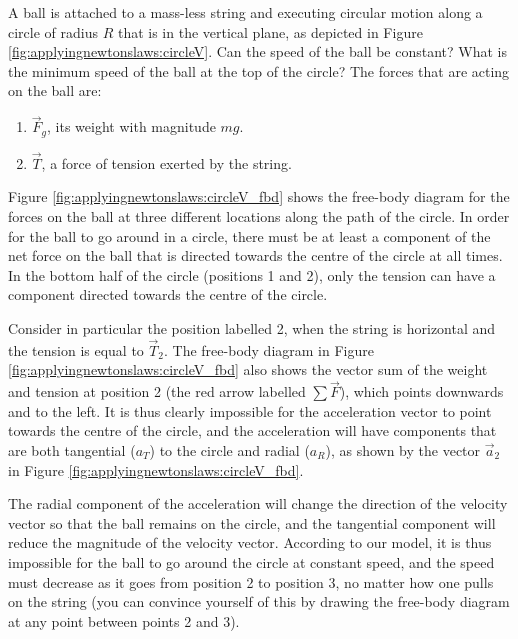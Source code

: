 \begin{example}{
A ball is attached to a mass-less string and executing circular motion along a circle of radius $R$ that is in the vertical plane, as depicted in Figure \ref{fig:applyingnewtonslaws:circleV}. Can the speed of the ball be constant? What is the minimum speed of the ball at the top of the circle?}
The forces that are acting on the ball are:
\begin{enumerate}
\item $\vec F_g$, its weight with magnitude $mg$.
\item $\vec T$, a force of tension exerted by the string.
\end{enumerate}
Figure \ref{fig:applyingnewtonslaws:circleV_fbd} shows the free-body diagram for the forces on the ball at three different locations along the path of the circle.
In order for the ball to go around in a circle, there must be at least a component of the net force on the ball that is directed towards the centre of the circle at all times. In the bottom half of the circle (positions 1 and 2), only the tension can have a component directed towards the centre of the circle.

Consider in particular the position labelled 2, when the string is horizontal and the tension is equal to $\vec T_2$. The free-body diagram in Figure \ref{fig:applyingnewtonslaws:circleV_fbd} also shows the vector sum of the weight and tension at position 2 (the red arrow labelled $\sum \vec F$), which points downwards and to the left. It is thus clearly impossible for the acceleration vector to point towards the centre of the circle, and the acceleration will have components that are both tangential ($a_T$) to the circle and radial ($a_R$), as shown by the vector $\vec a_2$ in Figure \ref{fig:applyingnewtonslaws:circleV_fbd}.

The radial component of the acceleration will change the direction of the velocity vector so that the ball remains on the circle, and the tangential component will reduce the magnitude of the velocity vector. According to our model, it is thus impossible for the ball to go around the circle at constant speed, and the speed must decrease as it goes from position 2 to position 3, no matter how one pulls on the string (you can convince yourself of this by drawing the free-body diagram at any point between points 2 and 3). 


\end{example}
